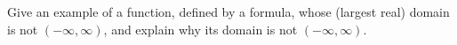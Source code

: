 Give an example of a function, defined by a formula, whose (largest real) domain is not $(-\infty,\infty)$, and explain why its domain is not $(-\infty,\infty)$.

